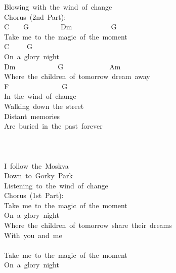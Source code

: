 \documentclass[]{book}
\begin{document}
Blowing~with~the~wind~of~change~\\
Chorus~(2nd~Part):\\
C~~~~G~~~~~~~~~Dm~~~~~~~~~~~G\\
Take~me~to~the~magic~of~the~moment\\
\hspace*{0.333em}\hspace*{0.333em}\hspace*{0.333em}\hspace*{0.333em}\hspace*{0.333em}C~~~~~G\\
On~a~glory~night\\
\hspace*{0.333em}\hspace*{0.333em}\hspace*{0.333em}\hspace*{0.333em}\hspace*{0.333em}\hspace*{0.333em}\hspace*{0.333em}\hspace*{0.333em}\hspace*{0.333em}\hspace*{0.333em}Dm~~~~~~~~~~~~G~~~~~~~~~~~~~Am\\
Where~the~children~of~tomorrow~dream~away\\
\hspace*{0.333em}F~~~~~~~~~~~~~~~G\\
In~the~wind~of~change\\
Walking~down~the~street\\
Distant~memories\\
Are~buried~in~the~past~forever\\
~\\
~\\
~\\
I~follow~the~Moskva\\
Down~to~Gorky~Park\\
Listening~to~the~wind~of~change\\
Chorus~(1st~Part):\\
Take~me~to~the~magic~of~the~moment\\
On~a~glory~night\\
Where~the~children~of~tomorrow~share~their~dreams\\
With~you~and~me\\
~\\
Take~me~to~the~magic~of~the~moment\\
On~a~glory~night\\
\end{document}
